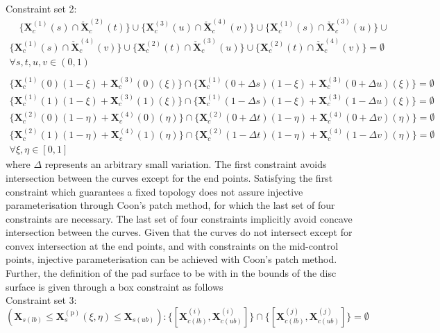 {
Constraint set 2: 
\begin{multline}
   \quad \{\bm X_c^{(1)}(s) \cap\bm {\check{X}}_{c}^{(2)}(t)\}\cup \{\bm X_c^{(3)}(u) \cap\bm {\check{X}}_{c}^{(4)}(v)\}\cup \{\bm X_c^{(1)}(s) \cap\bm {\check{X}}_{c}^{(3)}(u)\}\cup\\
   \{\bm X_c^{(1)}(s) \cap\bm {\check{X}}_{c}^{(4)}(v)\} \cup \{\bm X_c^{(2)}(t) \cap\bm {\check{X}}_{c}^{(3)}(u)\} \cup \{\bm X_c^{(2)}(t) \cap\bm {\check{X}}_{c}^{(4)}(v)\} = \emptyset\\ 
\forall s,t,u,v \in (0,1)\\
\\
\{\bm X_c^{(1)}(0)(1-\xi)+\bm X_c^{(3)}(0)(\xi)\} \cap \{\bm X_c^{(1)}(0+\Delta s)(1-\xi)+\bm X_c^{(3)}(0+\Delta u)(\xi)\} = \emptyset\\
\{\bm X_c^{(1)}(1)(1-\xi)+\bm X_c^{(3)}(1)(\xi)\} \cap \{\bm X_c^{(1)}(1-\Delta s)(1-\xi)+\bm X_c^{(3)}(1-\Delta u)(\xi)\} = \emptyset\\
\{\bm X_c^{(2)}(0)(1-\eta)+\bm X_c^{(4)}(0)(\eta)\} \cap \{\bm X_c^{(2)}(0+\Delta t)(1-\eta)+\bm X_c^{(4)}(0+\Delta v)(\eta)\} = \emptyset\\
\{\bm X_c^{(2)}(1)(1-\eta)+\bm X_c^{(4)}(1)(\eta)\} \cap \{\bm X_c^{(2)}(1-\Delta t)(1-\eta)+\bm X_c^{(4)}(1-\Delta v)(\eta)\} = \emptyset\\
\forall \xi,\eta \in [0,1]
\end{multline}
}
where $\Delta$ represents an arbitrary small variation. The first constraint avoids intersection between the curves except for the end points. Satisfying the first constraint which guarantees a fixed topology does not assure injective parameterisation through Coon's patch method, for which the last set of four constraints are necessary.  The last set of four constraints implicitly avoid concave intersection between the curves. Given that the curves do not intersect except for convex intersection at the end points, and with constraints on the mid-control points, injective parameterisation can be achieved with Coon's patch method. \\

Further, the definition of the pad surface to be with in the bounds of the disc surface is given through a box constraint as follows\\

Constraint set 3: \\
\begin{equation}
    (\bm X_{s(lb)} \leq \bm X_s^{(\mathrm p)}(\xi,\eta) \leq \bm X_{s(ub)}) :   \{[\bm X_{c(lb)}^{(i)},\bm X_{c(ub)}^{(i)}]\} \cap   \{[\bm X_{c(lb)}^{(j)},\bm X_{c(ub)}^{(j)}]\} = \emptyset  
\end{equation}

